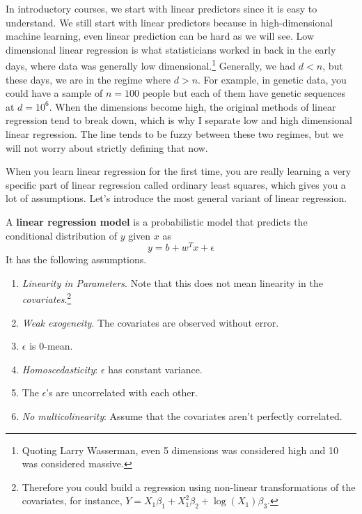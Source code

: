 In introductory courses, we start with linear predictors since it is easy to understand. We still start with linear predictors because in high-dimensional machine learning, even linear prediction can be hard as we will see. Low dimensional linear regression is what statisticians worked in back in the early days, where data was generally low dimensional.\footnote{Quoting Larry Wasserman, even 5 dimensions was considered high and 10 was considered massive. } Generally, we had $d < n$, but these days, we are in the regime where $d > n$. For example, in genetic data, you could have a sample of $n = 100$ people but each of them have genetic sequences at $d = 10^6$. When the dimensions become high, the original methods of linear regression tend to break down, which is why I separate low and high dimensional linear regression. The line tends to be fuzzy between these two regimes, but we will not worry about strictly defining that now. 

When you learn linear regression for the first time, you are really learning a very specific part of linear regression called ordinary least squares, which gives you a lot of assumptions. Let's introduce the most general variant of linear regression. 

\begin{definition}
  A \textbf{linear regression model} is a probabilistic model that predicts the conditional distribution of $y$ given $x$ as 
  \begin{equation}
    y = b + w^T x + \epsilon
  \end{equation}
  It has the following assumptions. 
  \begin{enumerate}
    \item \textit{Linearity in Parameters}. Note that this does not mean linearity in the \textit{covariates}.\footnote{Therefore you could build a regression using non-linear transformations of the covariates, for instance, $Y = X_1 \beta_1 + X_1^2 \beta_2 + \log(X_1) \beta_3$. }
    \item \textit{Weak exogeneity}. The covariates are observed without error. 
    \item $\epsilon$ is $0$-mean. 
    \item \textit{Homoscedasticity}: $\epsilon$ has constant variance. 
    \item The $\epsilon$'s are uncorrelated with each other. 
    \item \textit{No multicolinearity}: Assume that the covariates aren't perfectly correlated. 
  \end{enumerate}
\end{definition} 

